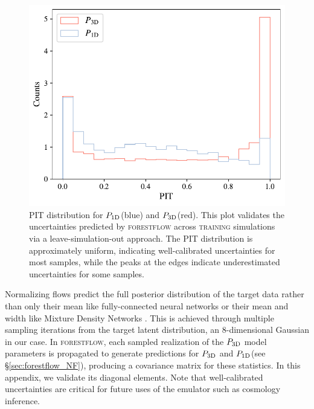 \documentclass[longauth]{aa}
\newcommand{\poned}{\ensuremath{P_{\rm 1D}}\xspace}
\newcommand{\pthreed}{\ensuremath{P_{\rm 3D}}\xspace}
\newcommand{\forestflow}{\textsc{forestflow}\xspace}
\newcommand{\lacehc}{\textsc{training}\xspace}
\begin{document}
\begin{appendix}
\begin{figure}
    \centering\includegraphics[width=\columnwidth]{figures/PIT_P3D.pdf}
    \caption{PIT distribution for \poned (blue) and \pthreed (red). This plot validates the uncertainties predicted by \forestflow across \lacehc simulations via a leave-simulation-out approach. The PIT distribution is approximately uniform, indicating well-calibrated uncertainties for most samples, while the peaks at the edges indicate underestimated uncertainties for some samples.}
    \label{fig:PIT}
\end{figure}

Normalizing flows predict the full posterior distribution of the target data rather than only their mean like fully-connected neural networks or their mean and width like Mixture Density Networks \citep[see][for some applications in cosmology]{ramachandra2022MachineLearningSynthetic, cabayol-garcia2023NeuralNetworkEmulator}. This is achieved through multiple sampling iterations from the target latent distribution, an 8-dimensional Gaussian in our case. In \forestflow, each sampled realization of the \pthreed model parameters is propagated to generate predictions for \pthreed and \poned (see \S\ref{sec:forestflow_NF}), producing a covariance matrix for these statistics. In this appendix, we validate its diagonal elements. Note that well-calibrated uncertainties are critical for future uses of the emulator such as cosmology inference.


\end{appendix}
\end{document}
